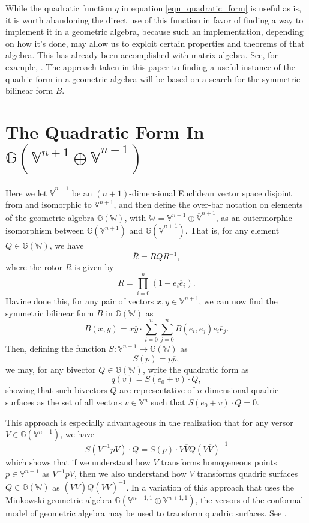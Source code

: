 \documentclass{birkjour}
\theoremstyle{definition}
\theoremstyle{remark}
\numberwithin{equation}{section}
\newcommand{\G}{\mathbb{G}}
\newcommand{\V}{\mathbb{V}}
\newcommand{\Vb}{\mathbb{\overline{V}}}
\newcommand{\W}{\mathbb{W}}
\begin{document}
While the quadratic function $q$ in equation \eqref{equ_quadratic_form} is useful as is, it is
worth abandoning the direct use of this function in favor of finding a way to implement it in
a geometric algebra, because
such an implementation, depending on how it's done, may allow us to exploit certain
properties and theorems of that algebra.
This has already been accomplished with matrix algebra.  See, for example, \cite{}.  The approach taken
in this paper to finding a useful instance of the quadric form in a geometric algebra will be based on
a search for the symmetric bilinear form $B$.

\section{The Quadratic Form In $\G(\V^{n+1}\oplus\Vb^{n+1})$}

Here we let $\Vb^{n+1}$ be an $(n+1)$-dimensional Euclidean vector space
disjoint from and isomorphic to $\V^{n+1}$, and then define the over-bar notation on elements
of the geometric algebra $\G(\W)$, with $\W=\V^{n+1}\oplus\Vb^{n+1}$, as an
outermorphic isomorphism between $\G(\V^{n+1})$ and $\G(\Vb^{n+1})$.
That is, for any element $Q\in\G(\W)$, we have
\begin{equation}
\overline{R} = RQR^{-1},
\end{equation}
where the rotor $R$ is given by
\begin{equation}
R = \prod_{i=0}^n(1-e_i\overline{e}_i).
\end{equation}
Havine done this, for any pair of vectors $x,y\in\V^{n+1}$, we can now find
the symmetric bilinear form $B$ in $\G(\W)$ as
\begin{equation}
B(x,y) = x\overline{y}\cdot\sum_{i=0}^n\sum_{j=0}^n B(e_i,e_j)e_i\overline{e}_j.
\end{equation}
Then, defining the function $S:\V^{n+1}\to\G(\W)$ as
\begin{equation}
S(p) = p\overline{p},
\end{equation}
we may, for any bivector $Q\in\G(\W)$, write the quadratic form as
\begin{equation}\label{equ_quadric_form_in_ga}
q(v) = S(e_0+v)\cdot Q,
\end{equation}
showing that such bivectors $Q$ are representative of $n$-dimensional
quadric surfaces as the set of all vectors $v\in\V^n$ such that $S(e_0+v)\cdot Q=0$.

This approach is especially advantageous in the realization that for
any versor $V\in\G(\V^{n+1})$, we have
\begin{equation}
S(V^{-1}pV)\cdot Q=S(p)\cdot V\overline{V}Q(V\overline{V})^{-1}
\end{equation}
which shows that if we understand how $V$ transforms homogeneous
points $p\in\V^{n+1}$ as $V^{-1}pV$, then we also understand
how $V$ transforms quadric surfaces $Q\in\G(\W)$ as $(V\overline{V})Q(V\overline{V})^{-1}$.
In a variation of this approach that uses the Minkowski geometric algebra $\G(\V^{n+1,1}\oplus\V^{n+1,1})$,
the versors of the conformal model of geometric algebra may be used to transform quadric surfaces.
See \cite{}.
\end{document}
